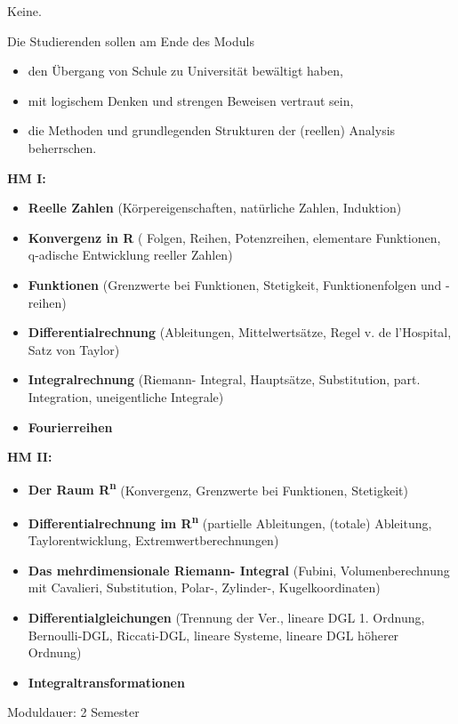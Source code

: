 \begin{module}
\begin{styleenv}
\begin{conditions}Keine.\end{conditions}


\end{styleenv}

\begin{learningoutcomes}
Die Studierenden sollen am Ende des Moduls

 \begin{itemize}\item den Übergang von Schule zu Universität bewältigt haben,  \item mit logischem Denken und strengen Beweisen vertraut sein,  \item die Methoden und grundlegenden Strukturen der (reellen) Analysis beherrschen.  \end{itemize}
\end{learningoutcomes}

\begin{content}
\textbf{HM I:}

 \begin{itemize}\item \textbf{Reelle Zahlen} (Körpereigenschaften, natürliche Zahlen, Induktion)  \item \textbf{Konvergenz in R} ( Folgen, Reihen, Potenzreihen, elementare Funktionen, q-adische Entwicklung reeller Zahlen)  \item \textbf{Funktionen }(Grenzwerte bei Funktionen, Stetigkeit, Funktionenfolgen und -reihen)  \item \textbf{Differentialrechnung }(Ableitungen, Mittelwertsätze, Regel v. de l'Hospital, Satz von Taylor)  \item \textbf{Integralrechnung} (Riemann- Integral, Hauptsätze, Substitution, part. Integration, uneigentliche Integrale)  \item \textbf{Fourierreihen}  \end{itemize}

\textbf{HM II:}

 \begin{itemize}\item \textbf{Der Raum R\textsuperscript{n}} (Konvergenz, Grenzwerte bei Funktionen, Stetigkeit)  \item \textbf{Differentialrechnung im R\textsuperscript{n}} (partielle Ableitungen, (totale) Ableitung, Taylorentwicklung, Extremwertberechnungen)  \item \textbf{Das mehrdimensionale Riemann- Integral} (Fubini, Volumenberechnung mit Cavalieri, Substitution, Polar-, Zylinder-, Kugelkoordinaten)  \item \textbf{Differentialgleichungen} (Trennung der Ver., lineare DGL 1. Ordnung, Bernoulli-DGL, Riccati-DGL, lineare Systeme, lineare DGL höherer Ordnung)  \item \textbf{Integraltransformationen}  \end{itemize}
\end{content}

\begin{remarks}Moduldauer: 2 Semester

\end{remarks}

\end{module}

